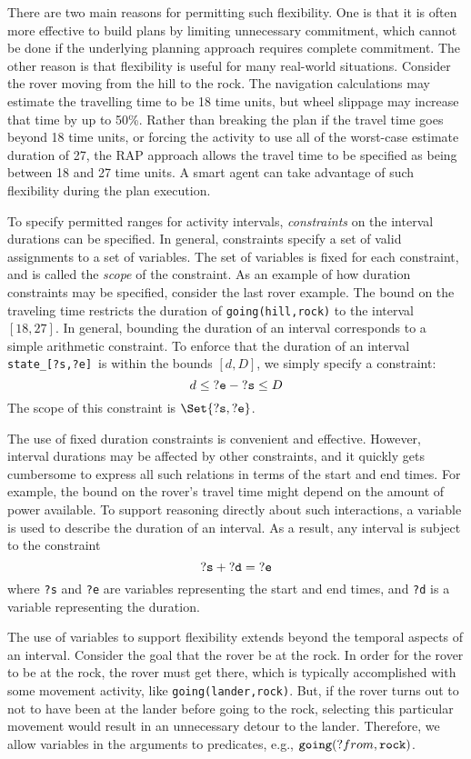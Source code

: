 There are two main reasons for permitting such flexibility.  One is
that it is often more effective to build plans by limiting unnecessary
commitment, which cannot be done if the underlying planning approach
requires complete commitment.  The other reason is that flexibility is
useful for many real-world situations.  Consider the rover moving from
the hill to the rock.  The navigation calculations may estimate the
travelling time to be 18 time units, but wheel slippage may increase
that time by up to 50\%.  Rather than breaking the plan if the travel
time goes beyond 18 time units, or forcing the activity to use all of
the worst-case estimate duration of 27, the RAP approach allows the
travel time to be specified as being between 18 and 27 time units.  A
smart agent can take advantage of such flexibility during the plan
execution.

To specify permitted ranges for activity intervals, {\em constraints}
on the interval durations can be specified.  In general, constraints
specify a set of valid assignments to a set of variables.  The set of
variables is fixed for each constraint, and is called the {\em scope}
of the constraint.  As an example of how duration constraints may be
specified, consider the last rover example.  The bound on the
traveling time restricts the duration of {\tt going(hill,rock)} to the
interval $[18,27]$.  In general, bounding the duration of an interval
corresponds to a simple arithmetic constraint.  To enforce that the
duration of an interval {\tt state\_[?s,?e]}\ is within the bounds
$[d,D]$, we simply specify a constraint:
 $$d \leq {\tt ?e} - {\tt ?s} \leq D$$
  The scope of this constraint is $\Set{{\tt ?s}, {\tt ?e}}$.

The use of fixed duration constraints is convenient and effective.
However, interval durations may be affected by other constraints, and
it quickly gets cumbersome to express all such relations in terms of
the start and end times.  For example, the bound on the rover's travel
time might depend on the amount of power available.  To support
reasoning directly about such interactions, a variable is used to
describe the duration of an interval.  As a result, any interval is
subject to the constraint
  $${\tt ?s} + {\tt ?d} = {\tt ?e}$$
  where {\tt ?s} and {\tt ?e} are variables representing the start and
end times, and {\tt ?d} is a variable representing the duration.

The use of variables to support flexibility extends beyond the 
temporal aspects of an interval.  Consider the goal that the rover be 
at the rock.  In order for the rover to be at the rock, the rover must 
get there, which is typically accomplished with some movement 
activity, like {\tt going(lander,rock)}.  But, if the rover turns out 
to not to have been at the lander before going to the rock, selecting 
this particular movement would result in an unnecessary detour to the 
lander.  Therefore, we allow variables in the arguments to predicates, 
e.g., ${\tt going}(?from,{\tt rock})$.

